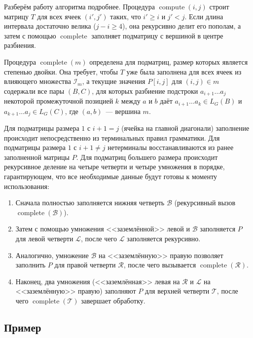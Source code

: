 Разберём работу алгоритма подробнее.
Процедура $\operatorname{compute}(i, j)$ строит матрицу $T$ для всех ячеек $(i', j')$ таких, что $i' \geqslant i$ и $j' < j$.
Если длина интервала достаточно велика ($j - i \geqslant 4$), она рекурсивно делит его пополам, а затем с помощью $\operatorname{complete}$ заполняет подматрицу с вершиной в центре разбиения.

Процедура $\operatorname{complete}(m)$ определена для подматриц, размер которых является степенью двойки.
Она требует, чтобы $T$ уже была заполнена для всех ячеек из влияющего множества $\mathcal{I}_m$, а текущие значения $P[i,j]$ для $(i,j) \in m$ содержали все пары $(B,C)$, для которых разбиение подстроки $a_{i+1} \dots a_j$ некоторой промежуточной позицией $k$ между $a$ и $b$ даёт $a_{i+1} \dots a_k \in L_G(B)$ и $a_{k+1} \dots a_j \in L_G(C)$, где $(a,b)$~--- вершина $m$.

Для подматрицы размера $1$ с $i + 1 = j$ (ячейка на главной диагонали) заполнение происходит непосредственно из терминальных правил грамматики.
Для подматрицы размера $1$ с $i + 1 \neq j$ нетерминалы восстанавливаются из ранее заполненной матрицы $P$.
Для подматриц большего размера происходит рекурсивное деление на четыре четверти и четыре умножения в порядке, гарантирующем, что все необходимые данные будут готовы к моменту использования:
\begin{enumerate}
  \item Сначала полностью заполняется нижняя четверть $\mathcal{B}$ (рекурсивный вызов $\operatorname{complete}(\mathcal{B})$).
  \item Затем с помощью умножения <<заземлённой>> левой и $\mathcal{B}$ заполняется $P$ для левой четверти $\mathcal{L}$, после чего $\mathcal{L}$ заполняется рекурсивно.
  \item Аналогично, умножение $\mathcal{B}$ на <<заземлённую>> правую позволяет заполнить $P$ для правой четверти $\mathcal{R}$, после чего вызывается $\operatorname{complete}(\mathcal{R})$.
  \item Наконец, два умножения (<<заземлённая>> левая на $\mathcal{R}$ и $\mathcal{L}$ на <<заземлённую>> правую) заполняют $P$ для верхней четверти $\mathcal{T}$, после чего $\operatorname{complete}(\mathcal{T})$ завершает обработку.
\end{enumerate}

\subsection{Пример}

